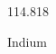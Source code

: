 \documentclass[12pt]{article}
\begin{document}
\hfill{}
\vfill
\begin{center}
  {\fontsize{50}{60}
  }

  114.818

Indium
\end{center}
\vfill
\end{document}
